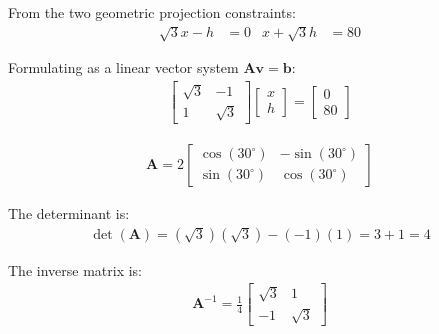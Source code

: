 \begin{enumerate}[label=\thesubsection.\arabic*, ref=\thesubsection.\theenumi]
\begin{center}
	\end{center}
	
	\solution
	From the two geometric projection constraints:
	\begin{align*}
		\sqrt{3}x - h &= 0 & x + \sqrt{3}h &= 80
	\end{align*}
	
	Formulating as a linear vector system $\mathbf{A}\mathbf{v} = \mathbf{b}$:
	\begin{align*}
		\begin{bmatrix} \sqrt{3} & -1 \\ 1 & \sqrt{3} \end{bmatrix} \begin{bmatrix} x \\ h \end{bmatrix} = \begin{bmatrix} 0 \\ 80 \end{bmatrix}
	\end{align*}
	
	\begin{align*}
		\mathbf{A} = 2 \begin{bmatrix} \cos(30^\circ) & -\sin(30^\circ) \\ \sin(30^\circ) & \cos(30^\circ) \end{bmatrix}
	\end{align*}
	
	The determinant is:
	\begin{align*}
		\det(\mathbf{A}) = (\sqrt{3})(\sqrt{3}) - (-1)(1) = 3 + 1 = 4
	\end{align*}
	
	The inverse matrix is:
	\begin{align*}
		\mathbf{A}^{-1} = \frac{1}{4} \begin{bmatrix} \sqrt{3} & 1 \\ -1 & \sqrt{3} \end{bmatrix}
	\end{align*}
	

\end{enumerate}
